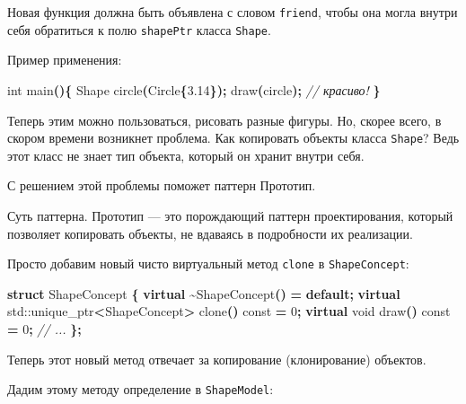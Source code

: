 \documentclass[14pt,a4paper]{article}
\newenvironment{Shaded}{\begin{paragraph}}{\end{paragraph}}
\newenvironment{Highlighting}{\begin{paragraph}}{\end{paragraph}}
\newcommand{\KeywordTok}[1]{\textcolor[rgb]{0.13,0.29,0.53}{\textbf{#1}}}
\newcommand{\DataTypeTok}[1]{\textcolor[rgb]{0.13,0.29,0.53}{#1}}
\newcommand{\DecValTok}[1]{\textcolor[rgb]{0.00,0.00,0.81}{#1}}
\newcommand{\FloatTok}[1]{\textcolor[rgb]{0.00,0.00,0.81}{#1}}
\newcommand{\CommentTok}[1]{\textcolor[rgb]{0.56,0.35,0.01}{\textit{#1}}}
\newcommand{\ControlFlowTok}[1]{\textcolor[rgb]{0.13,0.29,0.53}{\textbf{#1}}}
\newcommand{\OperatorTok}[1]{\textcolor[rgb]{0.81,0.36,0.00}{\textbf{#1}}}
\newcommand{\BuiltInTok}[1]{#1}
\newcommand{\AttributeTok}[1]{\textcolor[rgb]{0.77,0.63,0.00}{#1}}
\newcommand{\NormalTok}[1]{#1}
\begin{document}
Новая функция должна быть объявлена с словом \texttt{friend}, чтобы она
могла внутри себя обратиться к полю \texttt{shapePtr} класса
\texttt{Shape}.

Пример применения:

\begin{Shaded}
\begin{Highlighting}[]
\DataTypeTok{int}\NormalTok{ main}\OperatorTok{()\{}
\NormalTok{    Shape circle}\OperatorTok{(}\NormalTok{Circle}\OperatorTok{\{}\FloatTok{3.14}\OperatorTok{\});}
\NormalTok{    draw}\OperatorTok{(}\NormalTok{circle}\OperatorTok{);} \CommentTok{// красиво!}
\OperatorTok{\}}
\end{Highlighting}
\end{Shaded}

Теперь этим можно пользоваться, рисовать разные фигуры. Но, скорее
всего, в скором времени возникнет проблема. Как копировать объекты
класса \texttt{Shape}? Ведь этот класс не знает тип объекта, который он
хранит внутри себя.

С решением этой проблемы поможет паттерн Прототип.

Суть паттерна. Прототип --- это порождающий паттерн проектирования,
который позволяет копировать объекты, не вдаваясь в подробности их
реализации.

Просто добавим новый чисто виртуальный метод \texttt{clone} в
\texttt{ShapeConcept}:

\begin{Shaded}
\begin{Highlighting}[]
\KeywordTok{struct}\NormalTok{ ShapeConcept }\OperatorTok{\{}
    \KeywordTok{virtual} \OperatorTok{\textasciitilde{}}\NormalTok{ShapeConcept}\OperatorTok{()} \OperatorTok{=} \ControlFlowTok{default}\OperatorTok{;}
    \KeywordTok{virtual} \BuiltInTok{std::}\NormalTok{unique\_ptr}\OperatorTok{\textless{}}\NormalTok{ShapeConcept}\OperatorTok{\textgreater{}}\NormalTok{ clone}\OperatorTok{()} \AttributeTok{const} \OperatorTok{=} \DecValTok{0}\OperatorTok{;}
    \KeywordTok{virtual} \DataTypeTok{void}\NormalTok{ draw}\OperatorTok{()} \AttributeTok{const} \OperatorTok{=} \DecValTok{0}\OperatorTok{;}
    \CommentTok{// ...}
\OperatorTok{\};}
\end{Highlighting}
\end{Shaded}

Теперь этот новый метод отвечает за копирование (клонирование) объектов.

Дадим этому методу определение в \texttt{ShapeModel}:
\end{document}
